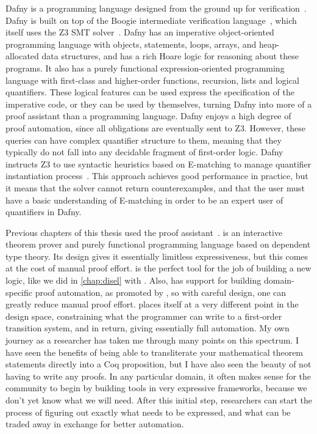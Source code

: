 Dafny is a programming language
designed from the ground up for verification~\cite{Leino:LPAR10}.
%
Dafny is built on top of the Boogie intermediate verification language~\cite{boogie-manual},
which itself uses the Z3 SMT solver~\cite{z3}.
%
Dafny has an imperative object-oriented programming language with
objects, statements, loops, arrays, and heap-allocated data structures,
and has a rich Hoare logic for reasoning about these programs.
%
It also has a purely functional expression-oriented programming language
with first-class and higher-order functions, recursion, lists and logical quantifiers.
%
These logical features can be used express the specification of the imperative code,
or they can be used by themselves, turning Dafny into more of a proof assistant
than a programming language.
%
Dafny enjoys a high degree of proof automation, since all obligations are
eventually sent to Z3.
%
However, these queries can have complex quantifier structure to them, meaning
that they typically do not fall into any decidable fragment of first-order logic.
%
Dafny instructs Z3 to use syntactic heuristics based on E-matching
to manage quantifier instantiation process~\cite{z3-e-matching,simplify}.
%
This approach achieves good performance in practice,
but it means that the solver cannot return counterexamples,
and that the user must have a basic understanding of E-matching
in order to be an expert user of quantifiers in Dafny.

Previous chapters of this thesis used the \Coq proof assistant~\cite{Coq}.
%
\Coq is an interactive theorem prover and purely functional programming language
based on dependent type theory.
%
Its design gives it essentially limitless expressiveness,
but this comes at the cost of manual proof effort.
%
\Coq is the perfect tool for the job of building a new logic,
like we did in \cref{chap:disel} with \disel.
%
Also, \Coq has support for building domain-specific proof automation,
as promoted by \citet{chlipala:cpdt},
so with careful design, one can greatly reduce manual proof effort.
%
\mypyvy places itself at a very different point in the design space,
constraining what the programmer can write to a first-order transition system,
and in return, giving essentially full automation.
%
%
My own journey as a researcher has taken me through many points
on this spectrum.
%
I have seen the benefits of being able to transliterate
your mathematical theorem statements directly into a Coq proposition,
but I have also seen the beauty of not having to write any proofs.
%
In any particular domain, it often makes sense for the community to
begin by building tools in very expressive frameworks,
because we don't yet know what we will need.
%
After this initial step, researchers can start the process of
figuring out exactly what needs to be expressed,
and what can be traded away in exchange for better automation.

